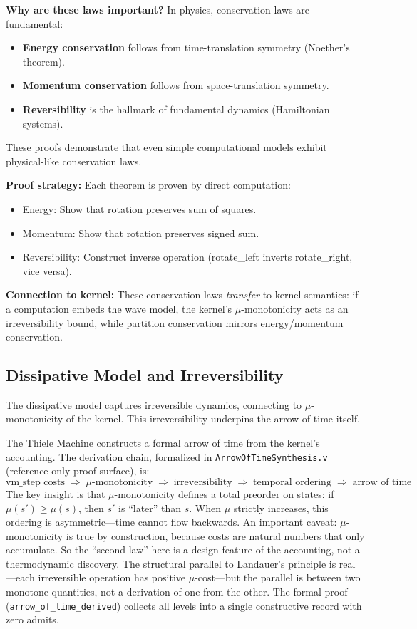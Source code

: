 \textbf{Why are these laws important?} In physics, conservation laws are fundamental:
\begin{itemize}
    \item \textbf{Energy conservation} follows from time-translation symmetry (Noether's theorem).
    \item \textbf{Momentum conservation} follows from space-translation symmetry.
    \item \textbf{Reversibility} is the hallmark of fundamental dynamics (Hamiltonian systems).
\end{itemize}

These proofs demonstrate that even simple computational models exhibit physical-like conservation laws.

\textbf{Proof strategy:} Each theorem is proven by direct computation:
\begin{itemize}
    \item Energy: Show that rotation preserves sum of squares.
    \item Momentum: Show that rotation preserves signed sum.
    \item Reversibility: Construct inverse operation (rotate\_left inverts rotate\_right, vice versa).
\end{itemize}

\textbf{Connection to kernel:} These conservation laws \textit{transfer} to kernel semantics: if a computation embeds the wave model, the kernel's $\mu$-monotonicity acts as an irreversibility bound, while partition conservation mirrors energy/momentum conservation.


\subsection{Dissipative Model and Irreversibility}

The dissipative model captures irreversible dynamics, connecting to $\mu$-monotonicity of the kernel. This irreversibility underpins the arrow of time itself.

The Thiele Machine constructs a formal arrow of time from the kernel's accounting. The derivation chain, formalized in \texttt{ArrowOfTimeSynthesis.v} (reference-only proof surface), is:
\[
\text{vm\_step costs} \;\Rightarrow\; \mu\text{-monotonicity} \;\Rightarrow\; \text{irreversibility} \;\Rightarrow\; \text{temporal ordering} \;\Rightarrow\; \text{arrow of time}
\]
The key insight is that $\mu$-monotonicity defines a total preorder on states: if $\mu(s') \geq \mu(s)$, then $s'$ is ``later'' than $s$. When $\mu$ strictly increases, this ordering is asymmetric---time cannot flow backwards. An important caveat: $\mu$-monotonicity is true by construction, because costs are natural numbers that only accumulate. So the ``second law'' here is a design feature of the accounting, not a thermodynamic discovery. The structural parallel to Landauer's principle is real---each irreversible operation has positive $\mu$-cost---but the parallel is between two monotone quantities, not a derivation of one from the other. The formal proof (\texttt{arrow\_of\_time\_derived}) collects all levels into a single constructive record with zero admits.


